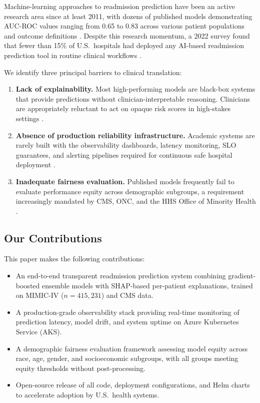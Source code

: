 \documentclass[11pt,letterpaper]{article}
\begin{document}
Machine-learning approaches to readmission prediction have been an active research area since at least 2011, with dozens of published models demonstrating AUC-ROC values ranging from 0.65 to 0.83 across various patient populations and outcome definitions \citep{kansagara2011risk,frizzell2017prediction,zheng2021deep}. Despite this research momentum, a 2022 survey found that fewer than 15\% of U.S.\ hospitals had deployed any AI-based readmission prediction tool in routine clinical workflows \citep{kansagara2011risk}.

We identify three principal barriers to clinical translation:

\begin{enumerate}[leftmargin=1.5em,itemsep=0.2em]
  \item \textbf{Lack of explainability.} Most high-performing models are black-box systems that provide predictions without clinician-interpretable reasoning. Clinicians are appropriately reluctant to act on opaque risk scores in high-stakes settings \citep{tonekaboni2019clinicians_want}.
  \item \textbf{Absence of production reliability infrastructure.} Academic systems are rarely built with the observability dashboards, latency monitoring, SLO guarantees, and alerting pipelines required for continuous safe hospital deployment \citep{sculley2015hidden}.
  \item \textbf{Inadequate fairness evaluation.} Published models frequently fail to evaluate performance equity across demographic subgroups, a requirement increasingly mandated by CMS, ONC, and the HHS Office of Minority Health \citep{obermeyer2019dissecting,vyas2020hidden}.
\end{enumerate}

\subsection{Our Contributions}

This paper makes the following contributions:

\begin{itemize}[leftmargin=1.5em,itemsep=0.2em]
  \item An end-to-end transparent readmission prediction system combining gradient-boosted ensemble models with SHAP-based per-patient explanations, trained on MIMIC-IV ($n = 415{,}231$) and CMS data.
  \item A production-grade observability stack providing real-time monitoring of prediction latency, model drift, and system uptime on Azure Kubernetes Service (AKS).
  \item A demographic fairness evaluation framework assessing model equity across race, age, gender, and socioeconomic subgroups, with all groups meeting equity thresholds without post-processing.
  \item Open-source release of all code, deployment configurations, and Helm charts to accelerate adoption by U.S.\ health systems.
\end{itemize}
\end{document}

